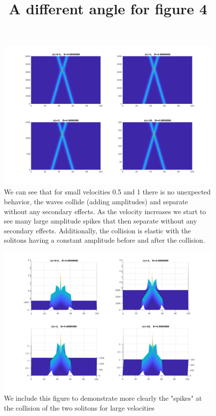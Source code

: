 \documentclass{article}
\begin{document}
\begin{enumerate}
\begin{figure}[h!]
\includegraphics[scale=0.35,center]{3D_V_S0.jpg}
\caption{We can see that for small velocities 0.5 and 1 there is no unexpected behavior, the waves collide (adding amplitudes) and separate without any secondary effects. As the velocity increases we start to see many large amplitude spikes that then separate without any secondary effects. Additionally, the collision is elastic with the solitons having a constant amplitude before and after the collision.}
\end{figure}
\begin{figure}[h!]
\title{A different angle for figure 4\\}
\includegraphics[scale=0.24,center]{3D2_V_S0.jpg}
\caption{We include this figure to demonstrate more clearly the "spikes" at the collision of the two solitons for large velocities}
\end{figure}


\end{enumerate}
\end{document}
